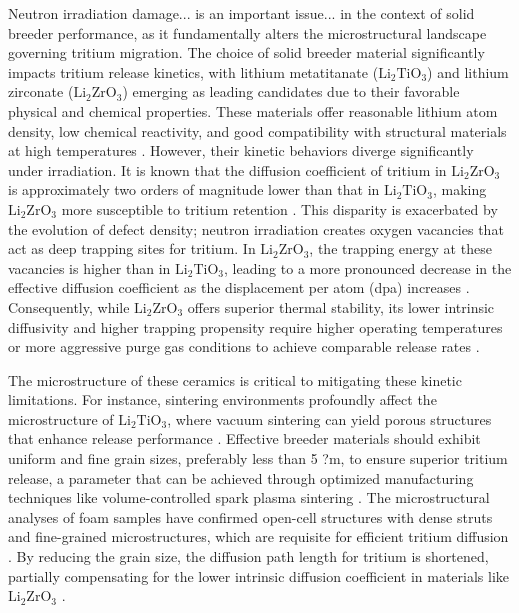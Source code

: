 \documentclass[review,12pt,a4paper]{elsarticle}
\begin{document}
\textcolor{highconf}{Neutron irradiation damage... is an important issue... in the context of solid breeder performance, as it fundamentally alters the microstructural landscape governing tritium migration. The choice of solid breeder material significantly impacts tritium release kinetics, with lithium metatitanate ($\mathrm{Li_2TiO_3}$) and lithium zirconate ($\mathrm{Li_2ZrO_3}$) emerging as leading candidates due to their favorable physical and chemical properties. These materials offer reasonable lithium atom density, low chemical reactivity, and good compatibility with structural materials at high temperatures \citep{wu_experiment_2024}. However, their kinetic behaviors diverge significantly under irradiation. It is known that the diffusion coefficient of tritium in $\mathrm{Li_2ZrO_3}$ is approximately two orders of magnitude lower than that in $\mathrm{Li_2TiO_3}$, making $\mathrm{Li_2ZrO_3}$ more susceptible to tritium retention \citep{nishikawa_release_2004}. This disparity is exacerbated by the evolution of defect density; neutron irradiation creates oxygen vacancies that act as deep trapping sites for tritium. In $\mathrm{Li_2ZrO_3}$, the trapping energy at these vacancies is higher than in $\mathrm{Li_2TiO_3}$, leading to a more pronounced decrease in the effective diffusion coefficient as the displacement per atom (dpa) increases \citep{nishikawa_release_2004}. Consequently, while $\mathrm{Li_2ZrO_3}$ offers superior thermal stability, its lower intrinsic diffusivity and higher trapping propensity require higher operating temperatures or more aggressive purge gas conditions to achieve comparable release rates \citep{tanaka_blanket_2000}.}

\textcolor{medconf}{The microstructure of these ceramics is critical to mitigating these kinetic limitations. For instance, sintering environments profoundly affect the microstructure of $\mathrm{Li_2TiO_3}$, where vacuum sintering can yield porous structures that enhance release performance \citep{ananyev_simulation_2020}. Effective breeder materials should exhibit uniform and fine grain sizes, preferably less than 5 ?m, to ensure superior tritium release, a parameter that can be achieved through optimized manufacturing techniques like volume-controlled spark plasma sintering \citep{gu_effects_2021}. The microstructural analyses of foam samples have confirmed open-cell structures with dense struts and fine-grained microstructures, which are requisite for efficient tritium diffusion \citep{ananyev_simulation_2020}. By reducing the grain size, the diffusion path length for tritium is shortened, partially compensating for the lower intrinsic diffusion coefficient in materials like $\mathrm{Li_2ZrO_3}$ \citep{tanaka_blanket_2000}.}
\end{document}
